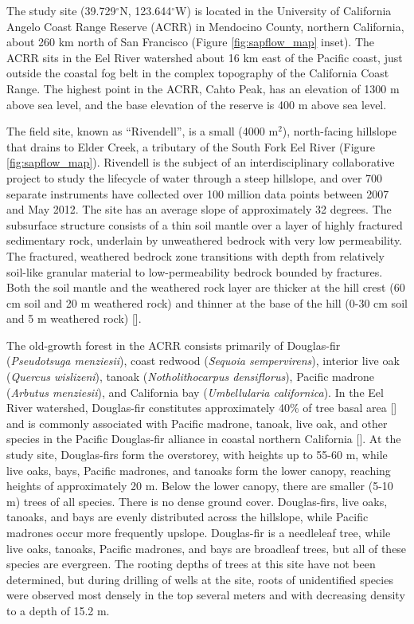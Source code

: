 The study site (39.729$^{\circ}$N, 123.644$^{\circ}$W) is located in the University of California Angelo Coast Range Reserve (ACRR) in Mendocino County, northern California, about 260 km north of San Francisco (Figure \ref{fig:sapflow_map} inset).  The ACRR sits in the Eel River watershed about 16 km east of the Pacific coast, just outside the coastal fog belt in the complex topography of the California Coast Range. The highest point in the ACRR, Cahto Peak, has an elevation of 1300 m above sea level, and the base elevation of the reserve is 400 m above sea level.
	
The field site, known as ``Rivendell'', is a small (4000 m$^2$), north-facing hillslope that drains to Elder Creek, a tributary of the South Fork Eel River (Figure \ref{fig:sapflow_map}).  Rivendell is the subject of an interdisciplinary collaborative project to study the lifecycle of water through a steep hillslope, and over 700 separate instruments have collected over 100 million data points between 2007 and May 2012.  The site has an average slope of approximately 32 degrees.  The subsurface structure consists of a thin soil mantle over a layer of highly fractured sedimentary rock, underlain by unweathered bedrock with very low permeability.  The fractured, weathered bedrock zone transitions with depth from relatively soil-like granular material to low-permeability bedrock bounded by fractures.  Both the soil mantle and the weathered rock layer are thicker at the hill crest (60 cm soil and 20 m weathered rock) and thinner at the base of the hill (0-30 cm soil and 5 m weathered rock) [\cite{rempe2010}].

The old-growth forest in the ACRR consists primarily of Douglas-fir (\textit{Pseudotsuga menziesii}), coast redwood (\textit{Sequoia sempervirens}), interior live oak (\textit{Quercus wislizeni}), tanoak (\textit{Notholithocarpus densiflorus}), Pacific madrone (\textit{Arbutus menziesii}), and California bay (\textit{Umbellularia californica}).  In the Eel River watershed, Douglas-fir constitutes approximately 40\% of tree basal area [\cite{woudenberg2010forest}] and is commonly associated with Pacific madrone, tanoak, live oak, and other species in the Pacific Douglas-fir alliance in coastal northern California [\cite{usda}].  At the study site, Douglas-firs form the overstorey, with heights up to 55-60 m, while live oaks, bays, Pacific madrones, and tanoaks form the lower canopy, reaching heights of approximately 20 m.  Below the lower canopy, there are smaller (5-10 m) trees of all species. There is no dense ground cover. Douglas-firs, live oaks, tanoaks, and bays are evenly distributed across the hillslope, while Pacific madrones occur more frequently upslope.  Douglas-fir is a needleleaf tree, while live oaks, tanoaks, Pacific madrones, and bays are broadleaf trees, but all of these species are evergreen. The rooting depths of trees at this site have not been determined, but during drilling of wells at the site, roots of unidentified species were observed most densely in the top several meters and with decreasing density to a depth of 15.2 m.

